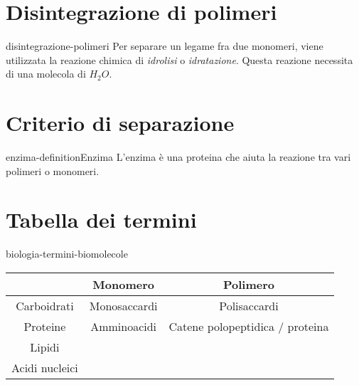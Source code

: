 \documentclass[preview]{standalone}
\begin{document}

\section{Disintegrazione di polimeri}

\begin{snippet}{disintegrazione-polimeri}
    Per separare un legame fra due monomeri, viene utilizzata la reazione chimica di \textit{idrolisi} o \textit{idratazione}.
    Questa reazione necessita di una molecola di \(H_2O\).
\end{snippet}


\section{Criterio di separazione}


\begin{snippetdefinition}{enzima-definition}{Enzima}
  L'enzima è una proteina che aiuta la reazione tra vari polimeri o monomeri.
\end{snippetdefinition}

\section{Tabella dei termini}

\begin{snippet}{biologia-termini-biomolecole}
  \begin{center}

    \begin{tabular}{ |c|c|c| }
      \hline
      & Monomero & Polimero \\ 
      \hline 
      Carboidrati & Monosaccardi & Polisaccardi \\
      \hline 
      Proteine & Amminoacidi & Catene polopeptidica / proteina \\
      \hline 
      Lipidi & & \\
      \hline 
      Acidi nucleici & & \\
      \hline

    \end{tabular}
  \end{center}
  \phantom{}
\end{snippet}

\end{document}
